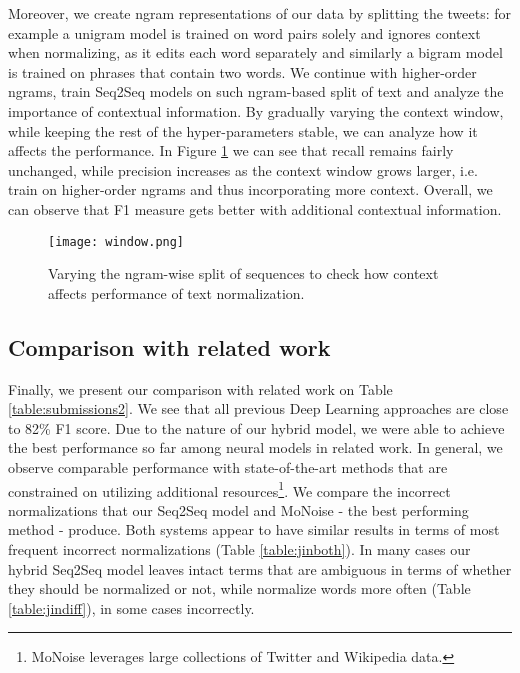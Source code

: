 \documentclass[letterpaper]{article} \usepackage{aaai19}  \usepackage{times}  \usepackage{helvet} \usepackage{courier}  \usepackage[hyphens]{url}  \usepackage{graphicx} \urlstyle{rm} \def\UrlFont{\rm}  \usepackage{graphicx}  \frenchspacing  \setlength{\pdfpagewidth}{8.5in}  \setlength{\pdfpageheight}{11in}
\newcommand{\citet}[1]{\citeauthor{#1}~\shortcite{#1}}
\newcommand{\citep}{\cite}
\newcommand{\hide}[1]{} \newcommand{\ag}[1]{\textsf{\textbf{\color{red}{[AG: #1]}}}}
\begin{document}
Moreover, we create ngram representations of our data by splitting the tweets: for example a unigram model is trained on word pairs solely and ignores context when normalizing, as it edits each word separately and similarly a bigram model is trained on phrases that contain two words. We continue with higher-order ngrams, train Seq2Seq models on such ngram-based split of text and analyze the importance of contextual information. By gradually varying the context window, while keeping the rest of the hyper-parameters stable, we can analyze how it affects the performance. In Figure \ref{fig:ngram} we can see that recall remains fairly unchanged, while precision increases as the context window grows larger, i.e. train on higher-order ngrams and thus incorporating more context. Overall, we can observe that F1 measure gets better with additional contextual information.  

\begin{figure}[h]
    \centering
    \texttt{[image: window.png]}
    \caption{Varying the ngram-wise split of sequences to check how context affects performance of text normalization.}
    \label{fig:ngram}
\end{figure}

\subsection{Comparison with related work}
Finally, we present our comparison with related work on Table \ref{table:submissions2}. We see that all previous Deep Learning approaches are close to 82\% F1 score. Due to the nature of our hybrid model, we were able to achieve the best performance so far among neural models in related work. In general, we observe comparable performance with state-of-the-art methods that are constrained on utilizing additional resources\footnote{MoNoise \citep{van2017monoise} leverages large collections of Twitter and Wikipedia data.}. We compare the incorrect normalizations that our Seq2Seq model and MoNoise - the best performing method - produce. Both systems appear to have similar results in terms of most frequent incorrect normalizations (Table \ref{table:jinboth}). In many cases our hybrid Seq2Seq model leaves intact terms that are ambiguous in terms of whether they should be normalized or not, while \citep{van2017monoise} normalize words more often (Table \ref{table:jindiff}), in some cases incorrectly.  

\hide{Additionally, we have implemented the forest approach\footnote{Our implementation achieved  F1 score, slightly less than \citet{jin2015ncsu} due to insufficient information on how splitting phrases was resolved.} (\textbf{Our\_RF} in Table \ref{table:submissions2})  and compared the incorrect normalizations that our Seq2Seq model and the random forest produce. Both systems appear to have similar results in terms of most frequent incorrect normalizations (Table \ref{table:jin}).}
\end{document}
